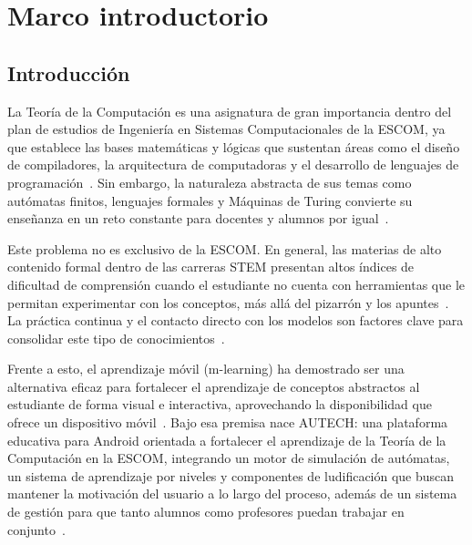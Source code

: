 
\chapter{Marco introductorio}
\label{ch:cap1}

\section{Introducción}
\label{sec:introduccion}

La Teoría de la Computación es una asignatura de gran importancia dentro del plan de estudios
de Ingeniería en Sistemas Computacionales de la ESCOM, ya que establece las bases matemáticas
y lógicas que sustentan áreas como el diseño de compiladores, la arquitectura de computadoras
y el desarrollo de lenguajes de programación~\cite{ipn2020, aho2006}. Sin embargo, la
naturaleza abstracta de sus temas como autómatas finitos, lenguajes formales y Máquinas de
Turing convierte su enseñanza en un reto constante para docentes y alumnos por
igual~\cite{sinchi2018, felder2016}.

Este problema no es exclusivo de la ESCOM. En general, las materias de alto contenido formal
dentro de las carreras STEM presentan altos índices de dificultad de comprensión cuando el
estudiante no cuenta con herramientas que le permitan experimentar con los conceptos, más allá
del pizarrón y los apuntes~\cite{munoz2012}. La práctica continua y el contacto directo con
los modelos son factores clave para consolidar este tipo de
conocimientos~\cite{hopcroft2007}.

Frente a esto, el aprendizaje móvil (m-learning) ha demostrado ser una alternativa eficaz para
fortalecer el aprendizaje de conceptos abstractos al estudiante de forma visual e interactiva,
aprovechando la disponibilidad que ofrece un dispositivo móvil~\cite{crompton2018}. Bajo esa
premisa nace AUTECH: una plataforma educativa para Android orientada a fortalecer el aprendizaje
de la Teoría de la Computación en la ESCOM, integrando un motor de simulación de autómatas, un
sistema de aprendizaje por niveles y componentes de ludificación que buscan mantener la
motivación del usuario a lo largo del proceso, además de un sistema de gestión para que tanto
alumnos como profesores puedan trabajar en conjunto~\cite{deterding2011}.

